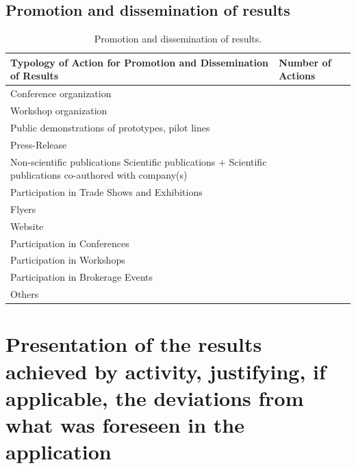 \documentclass{ani}
\begin{document}
  \section{Promotion and dissemination of results}
  \lipsum[20-24]
  
  \begin{table}[!htp]
    \begin{tabular}{|p{}|p{}|}
      \hline
      \textbf{Typology of Action for Promotion and Dissemination of Results} & \textbf{Number of Actions} \\ \hline
      Conference organization                                          &  \\ \hline
      Workshop organization                                            &  \\ \hline
      Public demonstrations of prototypes, pilot lines                 &  \\ \hline
      Press-Release                                                    &  \\ \hline
      Non-scientific publications Scientific publications + Scientific publications co-authored with company(s) &  \\ \hline
      Participation in Trade Shows and Exhibitions                     &  \\ \hline
      Flyers                                                           &  \\ \hline
      Website                                                          &  \\ \hline
      Participation in Conferences                                     &  \\ \hline
      Participation in Workshops                                       &  \\ \hline
      Participation in Brokerage Events                                &  \\ \hline
      Others                                                           &  \\ \hline
    \end{tabular}
    \caption{Promotion and dissemination of results.}
  \end{table}


\chapter{Presentation of the results achieved by activity, justifying, if applicable, the deviations from what was foreseen in the application}
\lipsum[25-30]
\end{document}

